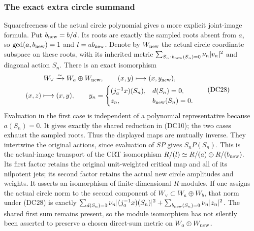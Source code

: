 \subsubsection{The exact extra circle summand}

Squarefreeness of the actual circle polynomial gives a more explicit
joint-image formula.  Put $b_{\rm new}=b/d$.  Its roots are exactly
the sampled roots absent from $a$, so
$\gcd(a,b_{\rm new})=1$ and $l=ab_{\rm new}$.  Denote by
$W_{\rm new}$ the actual circle coordinate subspace on these
roots, with its inherited metric
$\sum_{S_n:\,b_{\rm new}(S_n)=0}\nu_n|v_n|^2$ and diagonal
action $S_n$.  There is an exact isomorphism
\[
 \begin{gathered}
 W_\vee\xrightarrow{\sim}W_a\oplus W_{\rm new},\qquad
 (x,y)\longmapsto(x,y_{\rm new}),\\
 (x,z)\longmapsto(x,y),\qquad
 y_n=
 \begin{cases}
       (j_a^{-1}x)(S_n),&d(S_n)=0,\\
       z_n,&b_{\rm new}(S_n)=0 .
 \end{cases}
 \end{gathered}
 \tag{DC28}
\]
Evaluation in the first case is independent of a polynomial
representative because $a(S_n)=0$.  It gives exactly the shared
reduction in (DC10); the two cases exhaust the sampled roots.
Thus the displayed maps are mutually inverse.  They intertwine the
original actions, since evaluation of $SP$ gives $S_nP(S_n)$.
This is the actual-image transport of the CRT isomorphism
$R/(l)\simeq R/(a)\oplus R/(b_{\rm new})$.
Its first factor retains the original unit-weighted critical map
and all of its nilpotent jets; its second factor retains the actual
new circle amplitudes and weights.  It asserts an isomorphism of
finite-dimensional $R$-modules.  If one assigns the actual circle
norm to the second component of $W_\vee\subset W_a\oplus W_b$,
that norm under (DC28) is exactly
$\sum_{d(S_n)=0}\nu_n|(j_a^{-1}x)(S_n)|^2+
\sum_{b_{\rm new}(S_n)=0}\nu_n|z_n|^2$.
The shared first sum remains present, so the module isomorphism
has not silently been asserted to preserve a chosen direct-sum
metric on $W_a\oplus W_{\rm new}$.

